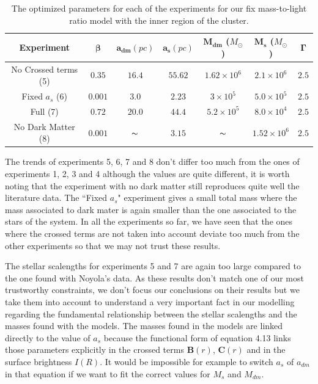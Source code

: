 \begin{table}[H]
\centering
\begin{tabular}{| c| c| c| c| c| c| c|}
    \hline
    \textbf{Experiment} & $\mathbf{\beta}$ & $\mathbf{a_{dm}} (pc)$ & $\mathbf{a_{s}} (pc)$ & $\mathbf{M_{dm}}$ ($M_{\odot}$) & $\mathbf{M_{s}}$ ($M_{\odot}$) & $\mathbf{\Gamma}$\\ \hline
	No Crossed terms (5) & $0.35$ &	$16.4$ &	$55.62$ &	$1.62 \times 10^{6}$ &	$2.1 \times 10^{6}$ &	$2.5$\\ \hline
	Fixed $a_s$ (6) &	$0.001$ &	$3.0$ &	$\mathbf{2.23}$ &	$3 \times 10^{5}$ &	$5.0 \times 10 ^{5}$ &	$2.5$\\ \hline
	Full (7) &	$0.72$ &	$20.0$ &	$44.4$ &	$5.2 \times 10^{5}$ &	$8.0 \times 10^{4}$ &	$2.5$\\ \hline
	No Dark Matter (8) &	$0.001$ &	$\thicksim$ & $ 3.15$ &	$\thicksim$ & $ 1.52 \times 10^{6}$ & 	$2.5$\\
    \hline
  \end{tabular} 
\caption[Optimized parameters for our fix mass-to-light ratio model with the inner region.]{The optimized parameters for each of the experiments for our fix mass-to-light ratio model with the inner region of the cluster.}
\end{table}

The trends of experiments 5, 6, 7 and 8 don't differ too much from the ones of experiments 1, 2, 3 and 4 although the values are quite different, it is worth noting that the experiment with no dark matter still reproduces quite well the literature data. The ``Fixed $a_s$" experiment gives a small total mass where the mass associated to dark mater is again smaller than the one associated to the stars of the system. In all the experiments so far, we have seen that the ones where the crossed terms are not taken into account deviate too much from the other experiments so that we may not trust these results. 

The stellar scalengths for experiments 5 and 7 are again too large compared to the one found with Noyola's data. As these results don't match one of our most trustworthy constraints, we don't focus our conclusions on their results but we take them into account to understand a very important fact in our modelling regarding the fundamental relationship between the stellar scalengths and the masses found with the models. The masses found in the models are linked directly to the value of $a_s$ because the functional form of equation 4.13 links those parameters explicitly in the crossed terms $\mathbf{B}(r)$, $\mathbf{C}(r)$ and in the surface brightness $I(R)$. It would be impossible for example to switch $a_s$ of $a_{dm}$ in that equation if we want to fit the correct values for $M_s$ and $M_{dm}$. 

